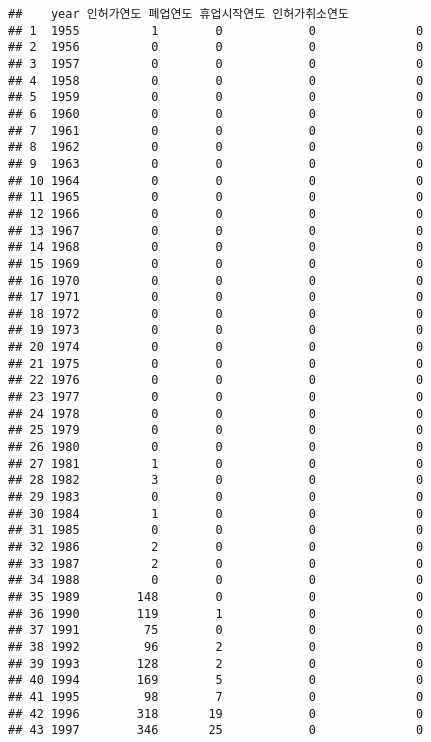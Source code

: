 \documentclass[
]{book}
\begin{document}
\begin{verbatim}
##    year 인허가연도 폐업연도 휴업시작연도 인허가취소연도
## 1  1955          1        0            0              0
## 2  1956          0        0            0              0
## 3  1957          0        0            0              0
## 4  1958          0        0            0              0
## 5  1959          0        0            0              0
## 6  1960          0        0            0              0
## 7  1961          0        0            0              0
## 8  1962          0        0            0              0
## 9  1963          0        0            0              0
## 10 1964          0        0            0              0
## 11 1965          0        0            0              0
## 12 1966          0        0            0              0
## 13 1967          0        0            0              0
## 14 1968          0        0            0              0
## 15 1969          0        0            0              0
## 16 1970          0        0            0              0
## 17 1971          0        0            0              0
## 18 1972          0        0            0              0
## 19 1973          0        0            0              0
## 20 1974          0        0            0              0
## 21 1975          0        0            0              0
## 22 1976          0        0            0              0
## 23 1977          0        0            0              0
## 24 1978          0        0            0              0
## 25 1979          0        0            0              0
## 26 1980          0        0            0              0
## 27 1981          1        0            0              0
## 28 1982          3        0            0              0
## 29 1983          0        0            0              0
## 30 1984          1        0            0              0
## 31 1985          0        0            0              0
## 32 1986          2        0            0              0
## 33 1987          2        0            0              0
## 34 1988          0        0            0              0
## 35 1989        148        0            0              0
## 36 1990        119        1            0              0
## 37 1991         75        0            0              0
## 38 1992         96        2            0              0
## 39 1993        128        2            0              0
## 40 1994        169        5            0              0
## 41 1995         98        7            0              0
## 42 1996        318       19            0              0
## 43 1997        346       25            0              0

\end{verbatim}
\end{document}
